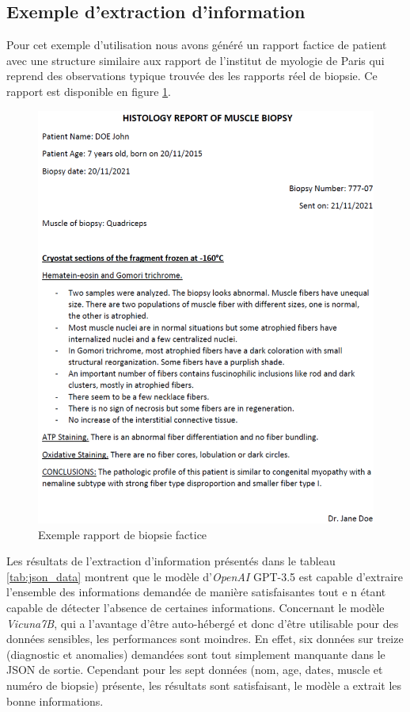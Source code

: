 \subsection{Exemple d'extraction d'information}
Pour cet exemple d'utilisation nous avons généré un rapport factice de patient avec une structure similaire aux rapport de l'institut de myologie de Paris qui reprend des observations typique trouvée des les rapports réel de biopsie. Ce rapport est disponible en figure \ref{fig:factice_report}. 
\begin{figure}[htbp]
  \centering
  \includegraphics[width=1\textwidth]{figures/pdf_biopsie.png}
  \caption[Rapport de biopsie factice]{Exemple rapport de biopsie factice}
  \label{fig:factice_report}
\end{figure}

Les  résultats de l'extraction d'information présentés dans le tableau \ref{tab:json_data} montrent que le modèle d'\textit{OpenAI} GPT-3.5 est capable d'extraire l'ensemble des informations demandée de manière satisfaisantes tout e    n étant capable de détecter l'absence de certaines informations. Concernant le modèle \textit{Vicuna7B}, qui a l'avantage d'être auto-hébergé et donc d'être utilisable pour des données sensibles, les performances sont moindres. En effet, six données sur treize (diagnostic et anomalies) demandées sont tout simplement manquante dans le JSON de sortie. Cependant pour les sept données (nom, age, dates, muscle et numéro de biopsie) présente, les résultats sont satisfaisant, le modèle a extrait les bonne informations.

